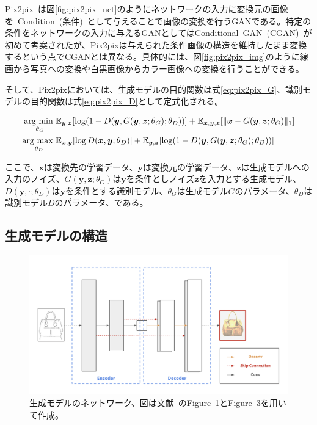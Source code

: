 Pix2pix~\cite{pix2pix}は図\ref{fig:pix2pix_net}のようにネットワークの入力に変換元の画像を~Condition~(条件)~として与えることで画像の変換を行うGANである。特定の条件をネットワークの入力に与えるGANとしてはConditional~GAN~(CGAN)~\cite{CGAN}が初めて考案されたが、Pix2pixは与えられた条件画像の構造を維持したまま変換するという点でCGANとは異なる。具体的には、図\ref{fig:pix2pix_img}のように線画から写真への変換や白黒画像からカラー画像への変換を行うことができる。

そして、Pix2pixにおいては、生成モデルの目的関数は式\ref{eq:pix2pix_G}、識別モデルの目的関数は式\ref{eq:pix2pix_D}として定式化される。

\begin{align}
    \label{eq:pix2pix_G}
    \mathop{\rm arg~min~}\limits _{\theta_G}& \mathbb{E}_{\boldsymbol{y}, \boldsymbol{z}}[\log (1-D(\boldsymbol{y}, G(\boldsymbol{y}, \boldsymbol{z}; \theta_G); \theta_D))]+\mathbb{E}_{\boldsymbol{x}, \boldsymbol{y}, \boldsymbol{z}}[\|\boldsymbol{x}-G(\boldsymbol{y}, \boldsymbol{z}; \theta_G)\|_{1}]\\
    \label{eq:pix2pix_D}
    \mathop{\rm arg~max~}\limits _{\theta_D}& \mathbb{E}_{\boldsymbol{x}, \boldsymbol{y}}[\log D(\boldsymbol{x}, \boldsymbol{y}; \theta_D)]+\mathbb{E}_{\boldsymbol{y}, \boldsymbol{z}}[\log (1-D(\boldsymbol{y}, G(\boldsymbol{y}, \boldsymbol{z}; \theta_G); \theta_D))]
\end{align}

ここで、$\boldsymbol{x}$は変換先の学習データ、$\boldsymbol{y}$は変換元の学習データ、$\boldsymbol{z}$は生成モデルへの入力のノイズ、$G(\boldsymbol{y},\boldsymbol{z};\theta_G)$は$\boldsymbol{y}$を条件としノイズ$\boldsymbol{z}$を入力とする生成モデル、$D(\boldsymbol{y},\cdot;\theta_D)$は$\boldsymbol{y}$を条件とする識別モデル、$\theta_G$は生成モデル$G$のパラメータ、$\theta_D$は識別モデル$D$のパラメータ、である。

\subsection{生成モデルの構造}

\begin{figure}[t]
\begin{center}
\includegraphics[width=0.95\hsize]{figure/u-net.png}
\caption{生成モデルのネットワーク、図は文献~\cite{pix2pix}のFigure~1とFigure~3を用いて作成。}
\label{fig:u-net}
\end{center}
\end{figure}

